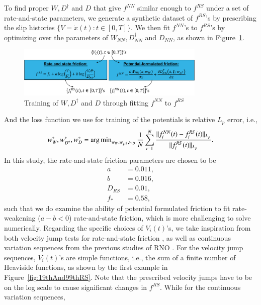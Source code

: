 To find proper $W, D^\dagger$ and $D$ that give $f^{NN}$ similar enough to $f^{RS}$ under a set of rate-and-state parameters, 
we generate a synthetic dataset of $f^{RS}$'s by prescribing the slip histories $\{V = \dot{x}(t) : t \in [0, T]\}$. 
We then fit $f^{NN}$'s to $f^{RS}$'s by optimizing over the parameters of $W_{NN}, D^\dagger_{NN}$ and $D_{NN}$, 
as shown in Figure~\ref{fig:training}. 
\begin{figure}
    \centering
    \includegraphics[width=0.8\textwidth]{figures/training.pdf}
    \caption{Training of $W, D^\dagger$ and $D$ through fitting $f^{NN}$ to $f^{RS}$}
    \label{fig:training}
\end{figure}
And the loss function we use for training of the potentials is relative $L_p$ error, 
i.e., 
\begin{align}
    w_W^*, w_{D^\dagger}^*, w_D^* = \operatorname{arg\,min}_{w_W, w_{D^\dagger}, w_D} \frac{1}{N} \sum_{i=1}^N \frac{\|f^{NN}_i(t) - f^{RS}_i(t)\|_{L_p}}{\|f^{RS}_i(t)\|_{L_p}} \label{eq:relativeLpError}. 
\end{align}
In this study, 
the rate-and-state friction parameters are chosen to be 
\begin{align*}
    a &= 0.011, \\
    b &= 0.016, \\
    D_{RS} &= 0.01, \\
    f_* &= 0.58, 
\end{align*}
such that we do examine the ability of potential formulated friction to fit rate-weakening ($a - b < 0$) rate-and-state friction, 
which is more challenging to solve  numerically. 
Regarding the specific choices of $V_i(t)$'s, 
we take inspiration from both velocity jump tests for rate-and-state friction \cite{ruina_slip_1983}, 
as well as continuous variation sequences from the previous studies of RNO \cite{BurigedeEric2023, BurigedeMarkovian2023}. 
For the velocity jump sequences, 
$V_i(t)$'s are simple functions, 
i.e., the sum of a finite number of Heaviside functions, 
as shown by the first example in Figure~{\ref{fig:19thAnd99thRS}}. 
Note that the prescribed velocity jumps have to be on the log scale to cause significant changes in $f^{RS}$.  
While for the continuous variation sequences, 
